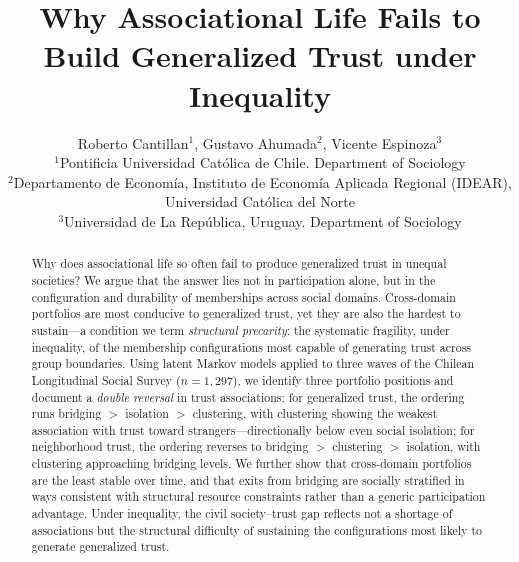 

\title{Why Associational Life Fails to Build Generalized Trust under Inequality}
\author{Roberto Cantillan$^{1}$, Gustavo Ahumada$^{2}$, Vicente Espinoza$^{3}$ \\
        \small $^{1}$Pontificia Universidad Católica de Chile. Department of Sociology\\
        \small $^{2}$Departamento de Economía, Instituto de Economía Aplicada Regional (IDEAR), Universidad Católica del Norte\\
        \small $^{3}$Universidad de La República, Uruguay. Department of Sociology\\
}


\maketitle

\begin{abstract}
Why does associational life so often fail to produce generalized trust in unequal societies? We argue that the answer lies not in participation alone, but in the configuration and durability of memberships across social domains. Cross-domain portfolios are most conducive to generalized trust, yet they are also the hardest to sustain---a condition we term \textit{structural precarity}: the systematic fragility, under inequality, of the membership configurations most capable of generating trust across group boundaries. Using latent Markov models applied to three waves of the Chilean Longitudinal Social Survey ($n = 1{,}297$), we identify three portfolio positions and document a \textit{double reversal} in trust associations: for generalized trust, the ordering runs bridging $>$ isolation $>$ clustering, with clustering showing the weakest association with trust toward strangers---directionally below even social isolation; for neighborhood trust, the ordering reverses to bridging $>$ clustering $>$ isolation, with clustering approaching bridging levels. We further show that cross-domain portfolios are the least stable over time, and that exits from bridging are socially stratified in ways consistent with structural resource constraints rather than a generic participation advantage. Under inequality, the civil society--trust gap reflects not a shortage of associations but the structural difficulty of sustaining the configurations most likely to generate generalized trust.
\end{abstract}



